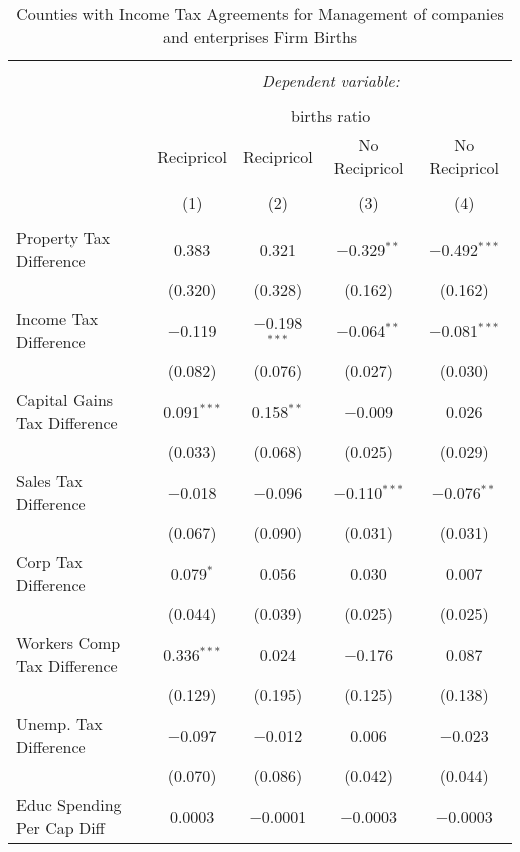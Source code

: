 
\begin{table}[!htbp] \centering 
  \caption{Counties with Income Tax Agreements for  Management of companies and enterprises Firm Births} 
  \label{55agreement} 
\begin{tabular}{@{\extracolsep{5pt}}lcccc} 
\\[-1.8ex]\hline 
\hline \\[-1.8ex] 
 & \multicolumn{4}{c}{\textit{Dependent variable:}} \\ 
\cline{2-5} 
\\[-1.8ex] & \multicolumn{4}{c}{births ratio} \\ 
 & Recipricol & Recipricol & No Recipricol & No Recipricol \\ 
\\[-1.8ex] & (1) & (2) & (3) & (4)\\ 
\hline \\[-1.8ex] 
 Property Tax Difference & 0.383 & 0.321 & $-$0.329$^{**}$ & $-$0.492$^{***}$ \\ 
  & (0.320) & (0.328) & (0.162) & (0.162) \\ 
  Income Tax Difference & $-$0.119 & $-$0.198$^{***}$ & $-$0.064$^{**}$ & $-$0.081$^{***}$ \\ 
  & (0.082) & (0.076) & (0.027) & (0.030) \\ 
  Capital Gains Tax Difference & 0.091$^{***}$ & 0.158$^{**}$ & $-$0.009 & 0.026 \\ 
  & (0.033) & (0.068) & (0.025) & (0.029) \\ 
  Sales Tax Difference & $-$0.018 & $-$0.096 & $-$0.110$^{***}$ & $-$0.076$^{**}$ \\ 
  & (0.067) & (0.090) & (0.031) & (0.031) \\ 
  Corp Tax Difference & 0.079$^{*}$ & 0.056 & 0.030 & 0.007 \\ 
  & (0.044) & (0.039) & (0.025) & (0.025) \\ 
  Workers Comp Tax Difference & 0.336$^{***}$ & 0.024 & $-$0.176 & 0.087 \\ 
  & (0.129) & (0.195) & (0.125) & (0.138) \\ 
  Unemp. Tax Difference & $-$0.097 & $-$0.012 & 0.006 & $-$0.023 \\ 
  & (0.070) & (0.086) & (0.042) & (0.044) \\ 
  Educ Spending Per Cap Diff & 0.0003 & $-$0.0001 & $-$0.0003 & $-$0.0003 \\ 

\end{tabular}
\end{table}
